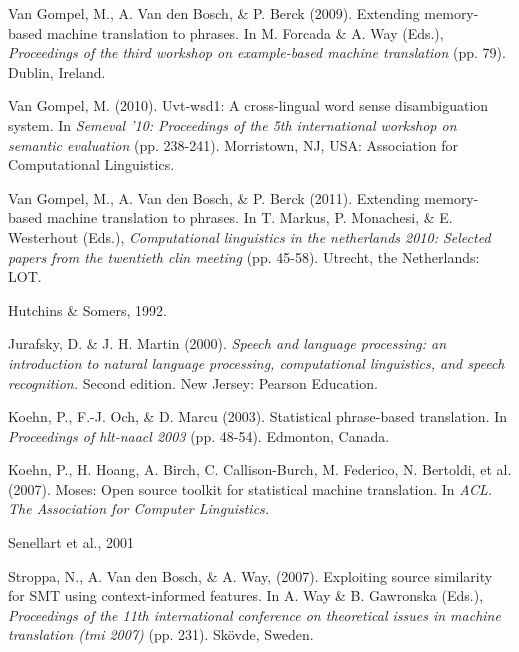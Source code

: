 \documentclass[12pt]{article}
\begin{document}
\begin{thebibliography}{99}
Van Gompel, M., A. Van den Bosch, \& P. Berck (2009). Extending memory-based machine translation to phrases. In M. Forcada \& A. Way (Eds.), \emph{Proceedings of the third workshop on example-based machine translation} (pp. 79). Dublin, Ireland.

Van Gompel, M. (2010). Uvt-wsd1: A cross-lingual word sense disambiguation system. In \emph{Semeval '10: Proceedings of the 5th international workshop on semantic evaluation} (pp. 238-241). Morristown, NJ, USA: Association for Computational Linguistics.

Van Gompel, M., A. Van den Bosch, \& P. Berck (2011). Extending memory-based
machine translation to phrases. In T. Markus, P. Monachesi, \& E. Westerhout (Eds.), \emph{Computational linguistics in the netherlands 2010: Selected papers from the twentieth clin meeting} (pp. 45-58). Utrecht, the Netherlands: LOT.

Hutchins \& Somers, 1992.

Jurafsky, D. \& J. H. Martin (2000). \emph{Speech and language processing: an introduction to natural language processing, computational linguistics, and speech recognition.} Second edition. New Jersey: Pearson Education.

Koehn, P., F.-J. Och, \& D. Marcu (2003). Statistical phrase-based translation. In \emph{Proceedings of hlt-naacl 2003} (pp. 48-54). Edmonton, Canada.

Koehn, P., H. Hoang, A. Birch, C. Callison-Burch, M. Federico, N. Bertoldi, et al. (2007). Moses: Open source toolkit for statistical machine translation. In \emph{ACL. The Association for Computer Linguistics.}

Senellart et al., 2001

Stroppa, N., A. Van den Bosch, \& A. Way, (2007). Exploiting source similarity for SMT using context-informed features. In A. Way \& B. Gawronska (Eds.), \emph{Proceedings of the 11th international conference on theoretical issues in machine translation (tmi 2007)} (pp. 231). Skövde, Sweden.

\end{thebibliography}
\end{document}
